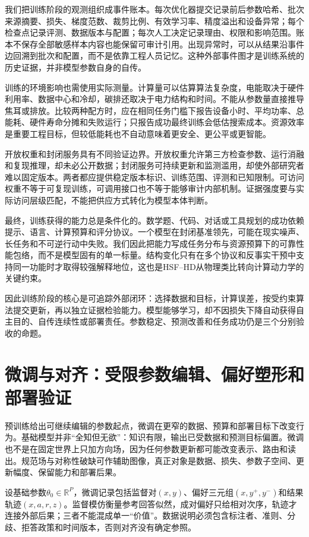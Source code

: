 我们把训练阶段的观测组织成事件账本。每次优化器提交记录前后参数哈希、批次来源摘要、损失、梯度范数、裁剪比例、有效学习率、精度溢出和设备异常；每个检查点记录评测、数据版本与配置；每次人工决定记录理由、权限和影响范围。账本不保存全部敏感样本内容也能保留可审计引用。出现异常时，可以从结果沿事件边回溯到批次和配置，而不是依靠工程人员记忆。这种外部事件图才是训练系统的历史证据，并非模型参数自身的自传。

训练的环境影响也需使用实际测量。计算量可以估算算法复杂度，电能取决于硬件利用率、数据中心和冷却，碳排还取决于电力结构和时间。不能从参数量直接推导焦耳或排放。比较两种配方时，应在相同任务门槛下报告设备小时、平均功率、总能耗、硬件寿命分摊和失败运行；只报告成功最终训练会低估搜索成本。资源效率是重要工程目标，但较低能耗也不自动意味着更安全、更公平或更智能。

开放权重和封闭服务具有不同验证边界。开放权重允许第三方检查参数、运行消融和复现推理，却未必公开数据；封闭服务可持续更新和监测滥用，却使外部研究者难以固定版本。两者都应提供稳定版本标识、训练范围、评测和已知限制。可访问权重不等于可复现训练，可调用接口也不等于能够审计内部机制。证据强度要与实际访问层级匹配，不能把供应方式转化为模型本体判断。

最终，训练获得的能力总是条件化的。数学题、代码、对话或工具规划的成功依赖提示、语言、计算预算和评分协议。一个模型在封闭基准领先，可能在现实噪声、长任务和不可逆行动中失败。我们因此把能力写成任务分布与资源预算下的可靠性能包络，而不是模型固有的单一标量。结构变化只有在多个协议和反事实干预中支持同一功能时才取得较强解释地位，这也是HSF--HD从物理类比转向计算动力学的关键约束。

因此训练阶段的核心是可追踪外部闭环：选择数据和目标，计算误差，按受约束算法提交更新，再以独立证据检验能力。模型能够学习，却不因损失下降自动获得自主目的、自传连续性或部署责任。参数稳定、预测改善和任务成功仍是三个分别验收的命题。

\section{微调与对齐：受限参数编辑、偏好塑形和部署验证}
\label{sec:finetuning_gauge_field}

预训练给出可继续编辑的参数起点，微调在更窄的数据、预算和部署目标下改变行为。基础模型并非“全知但无欲”：知识有限，输出已受数据和预测目标偏置。微调也不是在固定世界上只加方向场，因为任何参数更新都可能改变表示、路由和读出。规范场与对称性破缺可作辅助图像，真正对象是数据、损失、参数子空间、更新幅度、保留能力和部署后果。

设基础参数$\theta_0\in\mathbb R^P$，微调记录包括监督对$(x,y)$、偏好三元组$(x,y^+,y^-)$和结果轨迹$(x,a,r,z)$。监督模仿衡量参考回答似然，成对偏好只给相对次序，轨迹才连接外部后果；三者不能混成单一“价值”。数据说明必须包含标注者、准则、分歧、拒答政策和时间版本，否则对齐没有确定参照。

